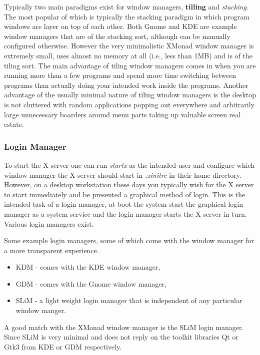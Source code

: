 Typically two main paradigms exist for window managers, \textbf{tilling} and \emph{stacking}.
The most popular of which is typically the stacking paradigm in which program windows are
layer on top of each other. Both Gnome and KDE are example window managers that are of the
stacking sort, although can be manually configured otherwise. However the very minimalistic
XMonad window manager is extremely small, uses almost no memory at all (i.e., less than 1MB)
and is of the tiling sort. The main advantage of tiling window managers comes in when you are
running more than a few programs and spend more time switching between programs than actually
doing your intended work inside the programs. Another advantage of the usually minimal nature
of tiling window managers is the desktop is not cluttered with random applications popping out
everywhere and arbitrarily large unnecessary boarders around menu parts taking up valuable
screen real estate.

\subsubsection{Login Manager}

To start the X server one can run \emph{startx} as the intended user and configure which window
manager the X server should start in \emph{.xinitrc} in their home directory. However, on a
desktop workstation these days you typically wish for the X server to start immediately and be
presented a graphical method of login. This is the intended task of a login manager, at boot
the system start the graphical login manager as a system service and the login manager starts
the X server in turn. Various login managers exist.

\begin{exmp}
	Some example login managers, some of which come with the window manager for a more
	transparent experience.
	\begin{itemize}
		\item KDM - comes with the KDE window manager,
		\item GDM - comes with the Gnome window manager,
		\item SLiM - a light weight login manager that is independent of any particular window manger.
	\end{itemize}
\end{exmp}

A good match with the XMonad window manager is the SLiM login manager. Since SLiM is very
minimal and does not reply on the toolkit libraries Qt or Gtk3 from KDE or GDM respectively.
